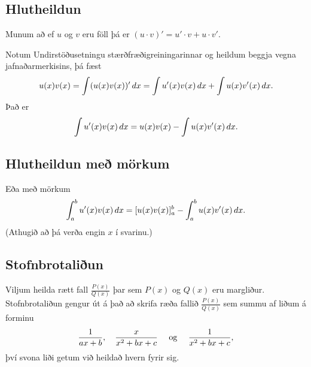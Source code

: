 \documentclass[b5paper,10pt,icelandic]{sphinxmanual}
\begin{document}
\subsection{Hlutheildun}
\label{kafli06:index-11}\label{kafli06:hlutheildun}
Munum að ef \(u\) og \(v\) eru föll þá er
\((u\cdot v)' = u'\cdot v + u \cdot v'\).

Notum Undirstöðusetningu stærðfræðigreiningarinnar og heildum beggja
vegna jafnaðarmerkisins, þá fæst
\begin{gather}
\begin{split}u(x)v(x) = \int (u(x)v(x))'\, dx = \int u'(x)v(x)\, dx + \int u(x)v'(x)\, dx.\end{split}\notag
\end{gather}
Það er
\begin{gather}
\begin{split}\int u'(x)v(x)\, dx = u(x)v(x) -  \int u(x)v'(x)\, dx.\end{split}\notag
\end{gather}

\subsection{Hlutheildun með mörkum}
\label{kafli06:hlutheildun-me-morkum}
Eða með mörkum
\begin{gather}
\begin{split}\int_a^b u'(x)v(x)\, dx = [u(x)v(x)]_a^b -  \int_a^b u(x)v'(x)\, dx.\end{split}\notag
\end{gather}
(Athugið að þá verða engin \(x\) í svarinu.)


\subsection{Stofnbrotaliðun}
\label{kafli06:stofnbrotaliun}\label{kafli06:index-12}
Viljum heilda rætt fall \(\frac{P(x)}{Q(x)}\) þar sem \(P(x)\)
og \(Q(x)\) eru margliður. Stofnbrotaliðun gengur út á það að skrifa ræða fallið
\(\frac{P(x)}{Q(x)}\) sem summu af liðum á forminu
\begin{gather}
\begin{split}\frac{1}{ax+b}, \quad \frac{x}{x^2+bx+c} \quad\text{ og }\quad \frac{1}{x^2+bx+c},\end{split}\notag
\end{gather}
því svona liði getum við heildað hvern fyrir sig.
\end{document}
